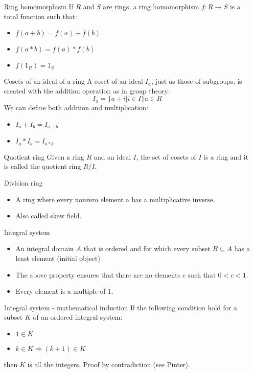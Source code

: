 \documentclass[presentation]{beamer}
\begin{document}
\begin{frame}[label={sec:org2c08416}]{Ring homomorphism}
If \(R\) and \(S\) are rings, a ring homomorphism \(f: R \rightarrow S\) is a
total function such that:

\begin{itemize}
\item \(f(a + b) = f(a) + f(b)\)
\item \(f(a * b) = f(a) * f(b)\)
\item \(f(1_R) = 1_S\)
\end{itemize}
\end{frame}

\begin{frame}[label={sec:orgcb04377}]{Cosets of an ideal of a ring}
A coset of an ideal \(I_a\), just as those of subgroups, is created with the
addition operation as in group theory: $$I_a = \{ a + i | i \in I\} a \in
    R$$ We can define both addition and multiplication:

\begin{itemize}
\item \(I_a + I_b = I_{a + b}\)
\item \(I_a * I_b = I_{a * b}\)
\end{itemize}
\end{frame}

\begin{frame}[label={sec:orgd58dfd4}]{Quotient ring}
Given a ring \(R\) and an ideal \(I\), the set of cosets of \(I\) is a ring and
it is called the quotient ring \(R/I\).
\end{frame}

\begin{frame}[label={sec:org7875114}]{Division ring}
\begin{itemize}
\item A ring where every nonzero element a has a multiplicative inverse.
\item Also called skew field.
\end{itemize}
\end{frame}
\begin{frame}[label={sec:org81d4ae7}]{Integral system}
\begin{itemize}
\item An integral domain \(A\) that is \alert{ordered} and for which every subset \(B \subseteq
      A\) has a \alert{least element} (initial object)
\item The above property ensures that there are no elements \(c\) such that \(0<c<1\).
\item Every element is a multiple of 1.
\end{itemize}
\end{frame}
\begin{frame}[label={sec:orgbb25b85}]{Integral system - mathematical induction}
If the following condition hold for a subset \(K\) of an ordered integral system:
\begin{itemize}
\item \(1 \in K\)
\item \(k \in K \Rightarrow (k+1) \in K\)
\end{itemize}
then \(K\) is all the integers. Proof by contradiction (see Pinter).
\end{frame}
\end{document}
